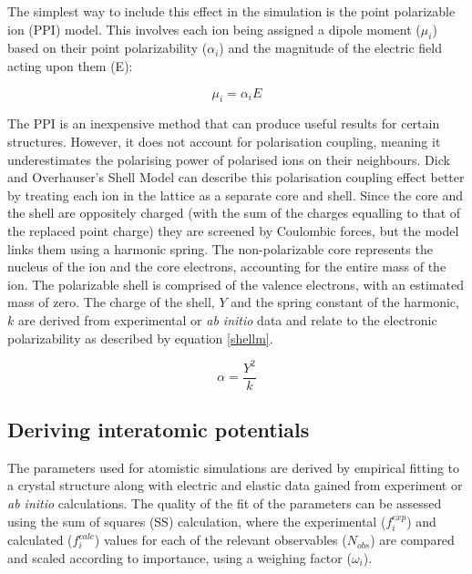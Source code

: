 \documentclass[12pt]{report}
\begin{document}
The simplest way to include this effect in the simulation is the point polarizable ion (PPI) model.
This involves each ion being assigned a dipole moment ($\mu_i$) based on their point polarizability ($\alpha_i$) and the magnitude of the electric field acting upon them (E):

\begin{equation}
    \mu_i = \alpha_i E
\label{ppi}
\end{equation}

\noindent
The PPI is an inexpensive method that can produce useful results for certain structures.
However, it does not account for polarisation coupling, meaning it underestimates the polarising power of polarised ions on their neighbours.
Dick and Overhauser’s Shell Model\cite{dick1958} can describe this polarisation coupling effect better by treating each ion in the lattice as a separate core and shell.
Since the core and the shell are oppositely charged (with the sum of the charges equalling to that of the replaced point charge) they are screened by Coulombic forces, but the model links them using a harmonic spring. 
The non-polarizable core represents the nucleus of the ion and the core electrons, accounting for the entire mass of the ion.
The polarizable shell is comprised of the valence electrons, with an estimated mass of zero.
The charge of the shell, $Y$ and the spring constant of the harmonic, $k$ are derived from experimental or \textit{ab initio} data and relate to the electronic polarizability as described by equation \ref{shellm}.\cite{dick1958}

\begin{equation}
    \alpha = \frac{Y^2}{k}
    \label{shellm}
\end{equation}

\subsection{Deriving interatomic potentials}

The parameters used for atomistic simulations are derived by empirical fitting to a crystal structure along with electric and elastic data gained from experiment or \textit{ab initio} calculations.
The quality  of the fit of the parameters can be assessed using the sum of squares (SS) calculation, where the experimental ($f_i^{exp}$) and calculated ($f_i^{calc}$) values for each of the relevant observables ($N_{obs}$) are compared and scaled according to importance, using a weighing factor ($\omega_i$).
\end{document}
